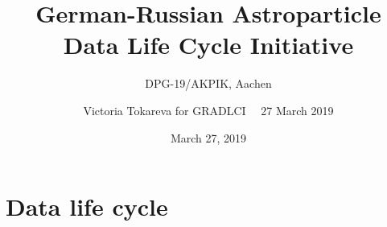 \documentclass[18pt]{beamer}
\title[GRADLCI]{German-Russian Astroparticle \\Data Life Cycle Initiative}
\subtitle{DPG-19/AKPIK, Aachen}
\author[Victoria Tokareva]{
  Victoria Tokareva for GRADLCI ~\textbar~27 March 2019
}
\institute{Institute for Nuclear Physics (IKP)}
\date{March  27, 2019}
\begin{document}




\section{Data life cycle}








\end{document}
